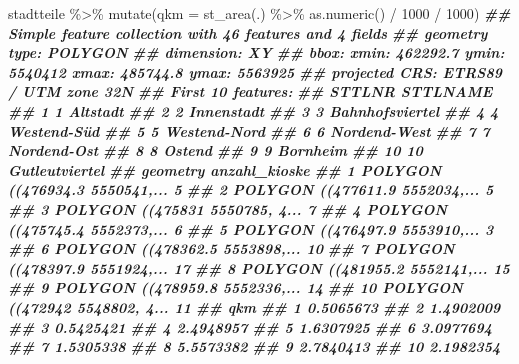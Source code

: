 \documentclass[
  ngerman,
]{article}
\newenvironment{Shaded}{\begin{snugshade}}{\end{snugshade}}
\newcommand{\AttributeTok}[1]{\textcolor[rgb]{0.77,0.63,0.00}{#1}}
\newcommand{\DecValTok}[1]{\textcolor[rgb]{0.00,0.00,0.81}{#1}}
\newcommand{\DocumentationTok}[1]{\textcolor[rgb]{0.56,0.35,0.01}{\textbf{\textit{#1}}}}
\newcommand{\FunctionTok}[1]{\textcolor[rgb]{0.00,0.00,0.00}{#1}}
\newcommand{\NormalTok}[1]{#1}
\newcommand{\SpecialCharTok}[1]{\textcolor[rgb]{0.00,0.00,0.00}{#1}}
\begin{document}
\begin{Shaded}
\begin{Highlighting}[]
\NormalTok{stadtteile }\SpecialCharTok{\%\textgreater{}\%}
  \FunctionTok{mutate}\NormalTok{(}\AttributeTok{qkm =} \FunctionTok{st\_area}\NormalTok{(.) }\SpecialCharTok{\%\textgreater{}\%} \FunctionTok{as.numeric}\NormalTok{() }\SpecialCharTok{/} \DecValTok{1000} \SpecialCharTok{/} \DecValTok{1000}\NormalTok{)}
\DocumentationTok{\#\# Simple feature collection with 46 features and 4 fields}
\DocumentationTok{\#\# geometry type:  POLYGON}
\DocumentationTok{\#\# dimension:      XY}
\DocumentationTok{\#\# bbox:           xmin: 462292.7 ymin: 5540412 xmax: 485744.8 ymax: 5563925}
\DocumentationTok{\#\# projected CRS:  ETRS89 / UTM zone 32N}
\DocumentationTok{\#\# First 10 features:}
\DocumentationTok{\#\#    STTLNR        STTLNAME}
\DocumentationTok{\#\# 1       1        Altstadt}
\DocumentationTok{\#\# 2       2      Innenstadt}
\DocumentationTok{\#\# 3       3 Bahnhofsviertel}
\DocumentationTok{\#\# 4       4     Westend{-}Süd}
\DocumentationTok{\#\# 5       5    Westend{-}Nord}
\DocumentationTok{\#\# 6       6    Nordend{-}West}
\DocumentationTok{\#\# 7       7     Nordend{-}Ost}
\DocumentationTok{\#\# 8       8          Ostend}
\DocumentationTok{\#\# 9       9        Bornheim}
\DocumentationTok{\#\# 10     10  Gutleutviertel}
\DocumentationTok{\#\#                          geometry anzahl\_kioske}
\DocumentationTok{\#\# 1  POLYGON ((476934.3 5550541,...             5}
\DocumentationTok{\#\# 2  POLYGON ((477611.9 5552034,...             5}
\DocumentationTok{\#\# 3  POLYGON ((475831 5550785, 4...             7}
\DocumentationTok{\#\# 4  POLYGON ((475745.4 5552373,...             6}
\DocumentationTok{\#\# 5  POLYGON ((476497.9 5553910,...             3}
\DocumentationTok{\#\# 6  POLYGON ((478362.5 5553898,...            10}
\DocumentationTok{\#\# 7  POLYGON ((478397.9 5551924,...            17}
\DocumentationTok{\#\# 8  POLYGON ((481955.2 5552141,...            15}
\DocumentationTok{\#\# 9  POLYGON ((478959.8 5552336,...            14}
\DocumentationTok{\#\# 10 POLYGON ((472942 5548802, 4...            11}
\DocumentationTok{\#\#          qkm}
\DocumentationTok{\#\# 1  0.5065673}
\DocumentationTok{\#\# 2  1.4902009}
\DocumentationTok{\#\# 3  0.5425421}
\DocumentationTok{\#\# 4  2.4948957}
\DocumentationTok{\#\# 5  1.6307925}
\DocumentationTok{\#\# 6  3.0977694}
\DocumentationTok{\#\# 7  1.5305338}
\DocumentationTok{\#\# 8  5.5573382}
\DocumentationTok{\#\# 9  2.7840413}
\DocumentationTok{\#\# 10 2.1982354}
\end{Highlighting}
\end{Shaded}
\end{document}
